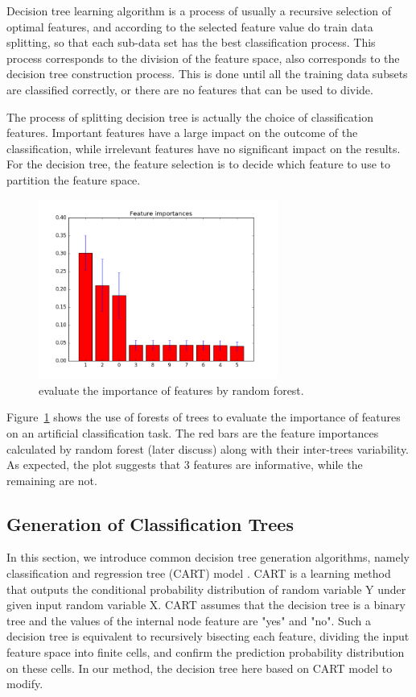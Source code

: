 \documentclass[master]{IPSstyle}
\begin{document}
{Decision tree learning algorithm is a process of usually a recursive selection of optimal features, and according to the selected feature value do train data splitting, so that each sub-data set has the best classification process. This process corresponds to the division of the feature space, also corresponds to the decision tree construction process. This is done until all the training data subsets are classified correctly, or there are no features that can be used to divide.

The process of splitting decision tree is actually the choice of classification features. Important features have a large impact on the outcome of the classification, while irrelevant features have no significant impact on the results. For the decision tree, the feature selection is to decide which feature to use to partition the feature space. 
\begin{figure}[H]
    \centering
    \includegraphics[width=0.7\textwidth]{figures/ch3_feature_importance.png}
    \caption{evaluate the importance of features by random forest.}
    \label{fig:RF_feature_importance}
\end{figure}
Figure~\ref{fig:RF_feature_importance} shows the use of forests of trees to evaluate the importance of features on an artificial classification task. The red bars are the feature importances calculated by random forest (later discuss) along with their inter-trees variability. As expected, the plot suggests that 3 features are informative, while the remaining are not. 

\subsection{Generation of Classification Trees}
In this section, we introduce common decision tree generation algorithms, namely classification and regression tree (CART) model \cite{breiman:1984}. CART is a learning method that outputs the conditional probability distribution of random variable $\mathrm{Y}$ under given input random variable $\mathrm{X}$. CART assumes that the decision tree is a binary tree and the values of the internal node feature are "yes" and "no". Such a decision tree is equivalent to recursively bisecting each feature, dividing the input feature space into finite cells, and confirm the prediction probability distribution on these cells. In our method, the decision tree here based on CART model to modify.

}
\end{document}
